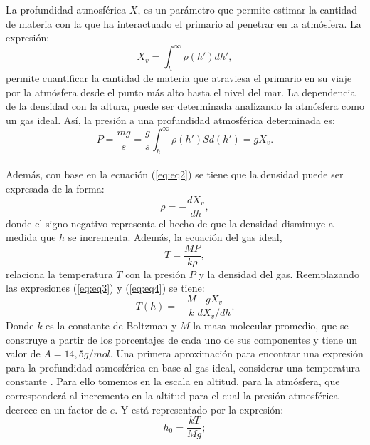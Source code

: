 La profundidad atmosférica $X$, es un parámetro que permite estimar la cantidad de materia con la que ha interactuado el primario al penetrar en la atmósfera. La expresión:
\begin{equation}
X_{v}= \int_{h}^{\infty} \rho (h') dh',
\label{eq:eq2}
\end{equation}
permite cuantificar la cantidad de materia que atraviesa el primario en su viaje por la atmósfera desde el punto más alto hasta el nivel del mar\cite{mauro:oxigen}. La dependencia de la densidad con la altura, puede ser determinada analizando la atmósfera como un gas ideal. Así, la presión a una profundidad atmosférica determinada es:
\begin{equation}
P=\frac{mg}{s} = \frac{g}{s} \int^{\infty}_{h} \rho(h')S d(h') = gX_{v}.
\label{eq:eq3}
\end{equation}\\
Además, con base en la ecuación (\ref{eq:eq2}) se tiene que la densidad puede ser expresada de la forma:
\begin{equation}
\rho = -\frac{dX_{v}}{dh},
\label{eq:eq4}
\end{equation}
donde el signo negativo representa el hecho de que la densidad disminuye a medida que $h$ se incrementa. Además, la ecuación del gas ideal,
\begin{equation}
    T = \frac{MP}{k\rho},
    \label{eq:eq4c}
\end{equation}{}
relaciona la temperatura $T$ con la presión $P$ y la densidad del gas. Reemplazando las expresiones (\ref{eq:eq3}) y (\ref{eq:eq4}) se tiene:
\begin{equation}
    T(h) = -\frac{M}{k} \frac{gX_{v}}{dX_{v} /dh}.
    \label{eq:eq5}
\end{equation}{}
Donde $k$ es la constante de Boltzman y $M$ la masa molecular promedio, que se construye a partir de los porcentajes de cada uno de sus componentes y tiene un valor de $A= 14,5 g/mol$. Una primera aproximación para encontrar una expresión para la profundidad atmosférica en base al gas ideal, considerar una temperatura constante \cite{mauro:oxigen}. Para ello tomemos en la escala en altitud, para la atmósfera, que corresponderá al incremento en la altitud para el cual la presión atmosférica decrece en un factor de $e$.  Y está representado por la expresión:
\begin{equation}
    h_{0}= \frac{kT}{Mg};
    \label{eq:eq6}
\end{equation}{}
